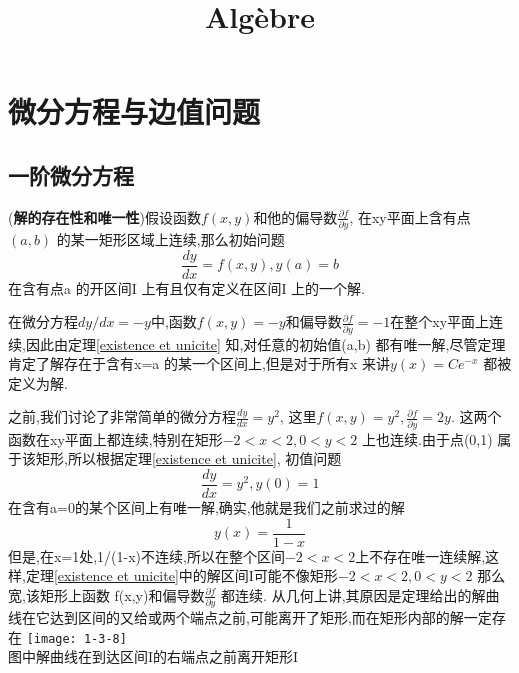 \documentclass{article}
\begin{document}
\title{Alg\`ebre}
\maketitle
\tableofcontents
\newpage

\section{微分方程与边值问题}
\subsection{一阶微分方程}
\begin{theorem}
  ({\bf 解的存在性和唯一性})假设函数$f(x,y)$和他的偏导数$\frac{\partial f}{\partial y}$, 在xy平面上含有点$(a,b)$ 的某一矩形区域上连续,那么初始问题
  \begin{equation}
    \frac{dy}{dx}=f(x,y),y(a)=b
  \end{equation}
  在含有点a 的开区间I 上有且仅有定义在区间I 上的一个解.
  \label{existence et unicite}
\end{theorem}
\begin{example}
  在微分方程$dy/dx=-y$中,函数$f(x,y)=-y$和偏导数$\frac{\partial f}{\partial y}=-1$在整个xy平面上连续,因此由定理\ref{existence et unicite} 知,对任意的初始值(a,b) 都有唯一解,尽管定理肯定了解存在于含有x=a 的某一个区间上,但是对于所有x 来讲$y(x)=Ce^{-x}$ 都被定义为解.
\end{example}
\begin{note}
  之前,我们讨论了非常简单的微分方程$\frac{dy}{dx}=y^2$, 这里$f(x,y)=y^2,\frac{\partial f}{\partial y}=2y$. 这两个函数在xy平面上都连续,特别在矩形$-2<x<2,0<y<2 $ 上也连续.由于点(0,1) 属于该矩形,所以根据定理\ref{existence et unicite}, 初值问题
  \begin{equation}
    \frac{dy}{dx}=y^2,y(0)=1
  \end{equation}
  在含有a=0的某个区间上有唯一解,确实,他就是我们之前求过的解$$y(x)=\frac{1}{1-x}$$
  但是,在x=1处,1/(1-x)不连续,所以在整个区间$-2<x<2 $上不存在唯一连续解,这样,定理\ref{existence et unicite}中的解区间I可能不像矩形$-2<x<2,0<y<2$ 那么宽,该矩形上函数 f(x,y)和偏导数$\frac{\partial f}{\partial y}$ 都连续. 从几何上讲,其原因是定理给出的解曲线在它达到区间的又给或两个端点之前,可能离开了矩形,而在矩形内部的解一定存在 \newline
\texttt{[image: 1-3-8]}\\
图中解曲线在到达区间I的右端点之前离开矩形I
\end{note}
\end{document}
